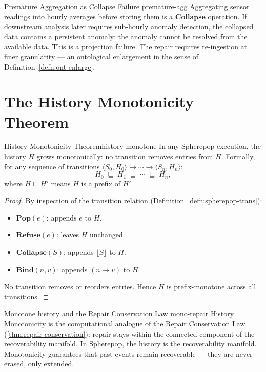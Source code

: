 \documentclass[12pt,twoside,openright]{book}
\newcommand{\csicon} {\marginpar{\tiny\color{DistBlue}\faCode}}
\begin{document}
\begin{example}{Premature Aggregation as Collapse Failure}%
  {premature-agg}
  \csicon
  Aggregating sensor readings into hourly averages before
  storing them is a $\mathbf{Collapse}$ operation. If
  downstream analysis later requires sub-hourly anomaly
  detection, the collapsed data contains a persistent
  anomaly: the anomaly cannot be resolved from the
  available data. This is a projection failure. The repair
  requires re-ingestion at finer granularity — an
  ontological enlargement in the sense of
  Definition~\ref{defn:ont-enlarge}.
\end{example}

\section{The History Monotonicity Theorem}

\begin{theorem}{History Monotonicity Theorem}{history-monotone}
  In any Spherepop execution, the history $H$ grows
  monotonically: no transition removes entries from $H$.
  Formally, for any sequence of transitions
  $\langle S_0, H_0 \rangle \to \cdots \to
  \langle S_n, H_n \rangle$:
  \[
    H_0 \;\sqsubseteq\; H_1 \;\sqsubseteq\;
    \cdots \;\sqsubseteq\; H_n,
  \]
  where $H \sqsubseteq H'$ means $H$ is a prefix of $H'$.
\end{theorem}

\begin{proof}
  By inspection of the transition relation
  (Definition~\ref{defn:spherepop-trans}):
  \begin{itemize}[nosep]
    \item $\mathbf{Pop}(e)$: appends $e$ to $H$.
    \item $\mathbf{Refuse}(e)$: leaves $H$ unchanged.
    \item $\mathbf{Collapse}(S)$: appends $\lfloor S \rfloor$
          to $H$.
    \item $\mathbf{Bind}(n,v)$: appends $(n \mapsto v)$
          to $H$.
  \end{itemize}
  No transition removes or reorders entries. Hence $H$
  is prefix-monotone across all transitions.
\end{proof}

\begin{remark}{Monotone history and the Repair Conservation Law}%
  {mono-repair}
  History Monotonicity is the computational analogue of
  the Repair Conservation Law
  (\cref{thm:repair-conservation}): repair stays within
  the connected component of the recoverability manifold.
  In Spherepop, the history is the recoverability manifold.
  Monotonicity guarantees that past events remain
  recoverable --- they are never erased, only extended.
\end{remark}
\end{document}
